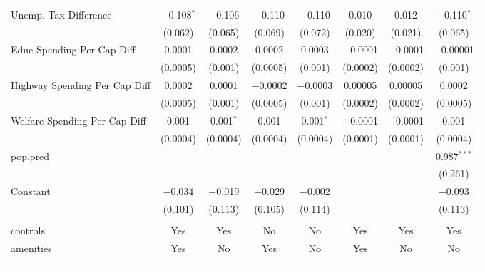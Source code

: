 \begin{table}[!htbp]
\begin{tabular}{@{\extracolsep{5pt}}lccccccc}
  Unemp. Tax Difference & $-$0.108$^{*}$ & $-$0.106 & $-$0.110 & $-$0.110 & 0.010 & 0.012 & $-$0.110$^{*}$ \\ 
  & (0.062) & (0.065) & (0.069) & (0.072) & (0.020) & (0.021) & (0.065) \\ 
  Educ Spending Per Cap Diff & 0.0001 & 0.0002 & 0.0002 & 0.0003 & $-$0.0001 & $-$0.0001 & $-$0.00001 \\ 
  & (0.0005) & (0.001) & (0.0005) & (0.001) & (0.0002) & (0.0002) & (0.001) \\ 
  Highway Spending Per Cap Diff & 0.0002 & 0.0001 & $-$0.0002 & $-$0.0003 & 0.00005 & 0.00005 & 0.0002 \\ 
  & (0.0005) & (0.001) & (0.0005) & (0.001) & (0.0002) & (0.0002) & (0.0005) \\ 
  Welfare Spending Per Cap Diff & 0.001 & 0.001$^{*}$ & 0.001 & 0.001$^{*}$ & $-$0.0001 & $-$0.0001 & 0.001 \\ 
  & (0.0004) & (0.0004) & (0.0004) & (0.0004) & (0.0001) & (0.0001) & (0.0004) \\ 
  pop.pred &  &  &  &  &  &  & 0.987$^{***}$ \\ 
  &  &  &  &  &  &  & (0.261) \\ 
  Constant & $-$0.034 & $-$0.019 & $-$0.029 & $-$0.002 &  &  & $-$0.093 \\ 
  & (0.101) & (0.113) & (0.105) & (0.114) &  &  & (0.113) \\ 
 \hline \\[-1.8ex] 
controls & Yes & Yes & No & No & Yes & Yes & Yes \\ 
amenities & Yes & No & Yes & No & Yes & No & No \\ 
\hline \\[-1.8ex] 
\hline 
\hline \\[-1.8ex] 
\end{tabular} 
\end{table} 
